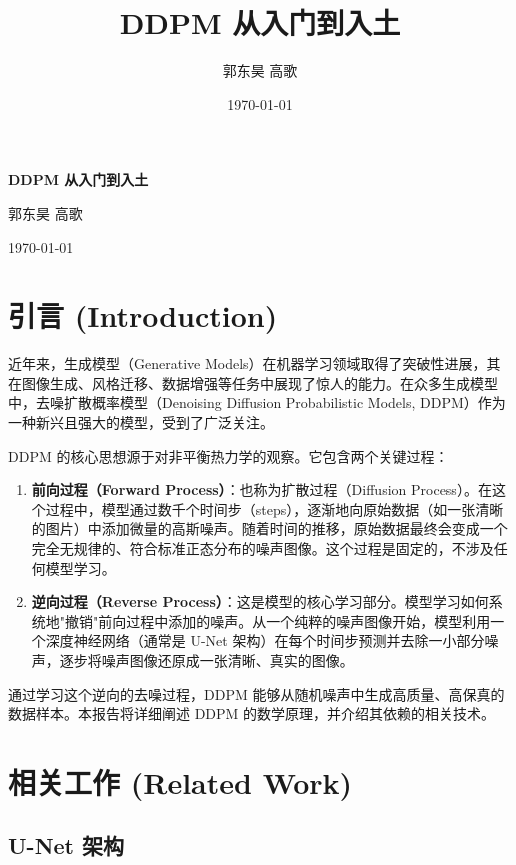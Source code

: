 \documentclass{ctexart}
\title{DDPM 从入门到入土}
\author{郭东昊 \quad 高歌}
\date{\today}
\begin{document}
\begin{titlepage}
\centering
\vspace*{2cm}
{\Huge\bfseries DDPM 从入门到入土\par}
\vspace{2cm}
{\Large 郭东昊 \quad 高歌\par}
\vspace{1cm}
{\large\today\par}
\vspace{4cm}
\end{titlepage}

\newpage
\tableofcontents
\thispagestyle{empty}
\newpage

\section{引言 (Introduction)}

近年来，生成模型（Generative Models）在机器学习领域取得了突破性进展，其在图像生成、风格迁移、数据增强等任务中展现了惊人的能力。在众多生成模型中，去噪扩散概率模型（Denoising Diffusion Probabilistic Models, DDPM）作为一种新兴且强大的模型，受到了广泛关注。

DDPM 的核心思想源于对非平衡热力学的观察。它包含两个关键过程：
\begin{enumerate}
    \item \textbf{前向过程（Forward Process）}：也称为扩散过程（Diffusion Process）。在这个过程中，模型通过数千个时间步（steps），逐渐地向原始数据（如一张清晰的图片）中添加微量的高斯噪声。随着时间的推移，原始数据最终会变成一个完全无规律的、符合标准正态分布的噪声图像。这个过程是固定的，不涉及任何模型学习。
    \item \textbf{逆向过程（Reverse Process）}：这是模型的核心学习部分。模型学习如何系统地"撤销"前向过程中添加的噪声。从一个纯粹的噪声图像开始，模型利用一个深度神经网络（通常是 U-Net 架构）在每个时间步预测并去除一小部分噪声，逐步将噪声图像还原成一张清晰、真实的图像。
\end{enumerate}

通过学习这个逆向的去噪过程，DDPM 能够从随机噪声中生成高质量、高保真的数据样本。本报告将详细阐述 DDPM 的数学原理，并介绍其依赖的相关技术。

\section{相关工作 (Related Work)}

\subsection{U-Net 架构}
\end{document}
